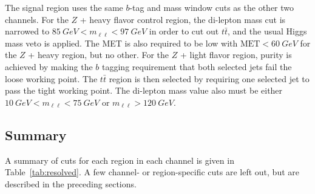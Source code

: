 The signal region uses the same $b$-tag and mass window cuts as the other two channels.
For the $Z$ + heavy flavor control region,
the di-lepton mass cut is narrowed to $\SI{85}{GeV} < m_{\ell\ell} < \SI{97}{GeV}$
in order to cut out $t\bar{t}$, and the usual Higgs mass veto is applied.
The MET is also required to be low with $\mathrm{MET} < \SI{60}{GeV}$
for the $Z$ + heavy region, but no other.
For the $Z$ + light flavor region, purity is achieved by making the $b$ tagging requirement
that both selected jets fail the loose working point.
The $t\bar{t}$ region is then selected by requiring
one selected jet to pass the tight working point.
The di-lepton mass value also must be either $\SI{10}{GeV} < m_{\ell\ell} < \SI{75}{GeV}$
or $m_{\ell\ell} > \SI{120}{GeV}$.

\subsection{Summary}

A summary of cuts for each region in each channel
is given in Table~\ref{tab:resolved}.
A few channel- or region-specific cuts are left out,
but are described in the preceding sections.

